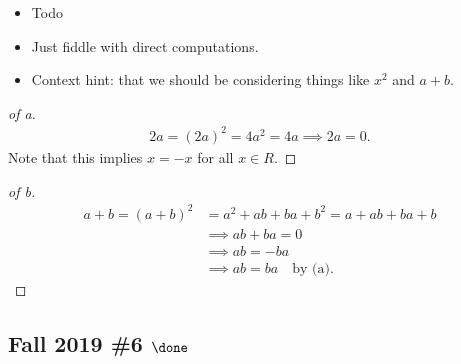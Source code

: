 \begin{concept}

\envlist

\begin{itemize}
\tightlist
\item
  Todo
\end{itemize}

\end{concept}

\begin{strategy}

\envlist

\begin{itemize}
\tightlist
\item
  Just fiddle with direct computations.
\item
  Context hint: that we should be considering things like \(x^2\) and
  \(a+b\).
\end{itemize}

\end{strategy}

\begin{solution}

\envlist

\begin{proof}[of a]

\begin{align*}
2a  = (2a)^2 = 4a^2 = 4a \implies 2a = 0
.\end{align*}
Note that this implies \(x = -x\) for all \(x\in R\).

\end{proof}

\begin{proof}[of b]

\begin{align*}
a+b = (a+b)^2 &= a^2 + ab + ba + b^2 = a + ab + ba + b \\
&\implies ab + ba = 0 \\
&\implies ab = -ba \\
&\implies ab = ba \quad\text{by (a)}
.\end{align*}

\end{proof}

\end{solution}

\hypertarget{fall-2019-6-done}{%
\subsection{\texorpdfstring{Fall 2019 \#6
\(\done\)}{Fall 2019 \#6 \textbackslash done}}\label{fall-2019-6-done}}

